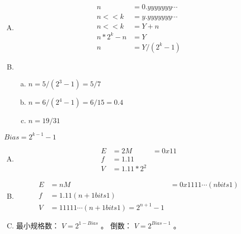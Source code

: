 {    %
    \begin{practicec}
        \begin{enumerate}[A.]
            \item
            {
                \begin{align}
                    n &= 0.yyyyyyy\cdots \\
                    n << k &= y.yyyyyyy\cdots \\
                    n << k &= Y + n \\
                    n * 2^k - n &= Y \\
                    n &= Y / (2^k - 1)
                \end{align}
            }
            \item
            {
                \begin{enumerate}[(a)]
                    \item $n = 5 / (2^3 - 1) = 5 / 7$
                    \item $n = 6 / (2^4 - 1) = 6 / 15 = 0.4$
                    \item $n = 19 / 31$
                \end{enumerate}
            }
        \end{enumerate}
    \end{practicec}

    \begin{practicec}
        $Bias = 2^{k - 1} - 1$
        \begin{enumerate}[A.]
            \item
            {
                \begin{align*}
                    E &= 2
                    M &= 0x11 \\
                    f &= 1.11 \\
                    V &= 1.11 * 2^2
                \end{align*}
            }
            \item
            {
                \begin{align*}
                    E &= n
                    M &= 0x1111\cdots (n bits 1) \\
                    f &= 1.11 (n + 1 bits 1) \\
                    V &= 11111\cdots (n + 1 bits 1) = 2^{n + 1} - 1
                \end{align*}
            }
            \item
            {
                最小规格数： $V = 2^{1 - Bias}$ 。
                倒数： $V = 2^{Bias - 1}$ 。

}
\end{enumerate}
\end{practicec}}
